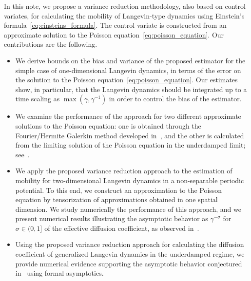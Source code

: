 \documentclass[11pt,a4paper]{article}
\theoremstyle{plain}
\numberwithin{equation}{section}
\begin{document}
In this note,
we propose a variance reduction methodology, also based on control variates,
for calculating the mobility of Langevin-type dynamics using Einstein's formula~\eqref{eq:einsteins_formula}.
The control variate is constructed from an approximate solution to the Poisson equation~\eqref{eq:poisson_equation}.
Our contributions are the following.
\begin{itemize}
    \item
        We derive bounds on the bias and variance of the proposed estimator for the simple case of one-dimensional Langevin dynamics,
        in terms of the error on the solution to the Poisson equation~\eqref{eq:poisson_equation}.
        Our estimates show, in particular, that the Langevin dynamics should be integrated up to a time scaling as $\max(\gamma, \gamma^{-1})$ in order to control the bias of the estimator.
    \item
        We examine the performance of the approach for two different approximate solutions to the Poisson equation:
        one is obtained through the Fourier/Hermite Galerkin method developed in~\cite{roussel2018spectral},
        and the other is calculated from the limiting solution of the Poisson equation in the underdamped limit;
        see~\cite{MR2427108}.
    \item
        We apply the proposed variance reduction approach to the estimation of mobility for two-dimensional Langevin dynamics in a non-separable periodic potential.
        To this end, we construct an approximation to the Poisson equation by tensorization of approximations obtained in one spatial dimension.
        We study numerically the performance of this approach,
        and we present numerical results illustrating the asymptotic behavior as $\gamma^{-\sigma}$ for $\sigma \in (0, 1]$ of the effective diffusion coefficient,
        as observed in~\cite{roussel_thesis}.
    \item
        Using the proposed variance reduction approach
        for calculating the diffusion coefficient of generalized Langevin dynamics in the underdamped regime,
        we provide numerical evidence supporting the asymptotic behavior conjectured in~\cite{GPGSUV21} using formal asymptotics.
\end{itemize}
\end{document}
